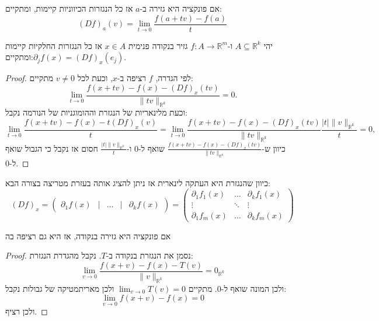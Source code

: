 \documentclass{tstextbook}
\begin{document}
\begin{proposition}
אם פונקציה היא גזירה ב-\(a\) אז כל הנגזרות הכיווניות קיימות, ומתקיים:
$$\left(D f\right)_{a}\left(v\right)=\operatorname*{lim}_{t\rightarrow0}{\frac{f\left(a+t v\right)-f\left(a\right)}{t}}$$

\end{proposition}
\begin{corollary}
יהי \(A\subseteq \mathbb{R}^k\) ו-\(f:A\to\mathbb{R}^m\) גזיר בנקודה פנימית \(x \in A\) אז כל הנגזרות החלקיות קיימות ומתקיים:\(\partial_{j}f(x)=(D f)_{x}(e_{j}).\)

\end{corollary}
\begin{proof}
לפי הגדרה, \(f\) רציפה ב-\(x\), וכעת לכל \(v\neq 0\) מתקיים:
$$\operatorname*{lim}_{t\to0}{\frac{f(x+t v )-f(x)-(D f)_{x}(t v )}{\|t v \|_{\mathbb{R}^{k}}}}=0.$$
וכעת מלינאריות של הנגזרת וההומוגניות של הנורמה נקבל:
$$\operatorname*{lim}_{t\to0}{\frac{f(x+t v)-f(x)-t\left(D f\right)_{x}(v)}{t}}=\operatorname*{lim}_{t\to0}{\frac{f(x+t v)-f(x)-\left(D f\right)_{x}(t v)}{\|t v\|_{\mathbb{R}^{k}}}}{\frac{|t|\|v\|_{\mathbb{R}^{k}}}{t}}=0,$$
כיוון ש-\(\frac{f(x+t v )\!-\!f(x)\!-\!(D f)_{x}(t v )}{\|t v \|_{\mathbb{R}^{k}}}\) שואף ל-0 ו-\(\frac{|t|\|v\|_{\mathbb{R}^{k}}}{t}\) חסום אז נקבל כי הגבול שואף ל-0.

\end{proof}
\begin{proposition}
כיוון שהנגזרת היא העתקה לינארית אז ניתן להציג אותה בעזרת מטריצה בצורה הבא:
$$(D f)_x=\left(\begin{array}{lllll}\partial_1 f(x) & \mid & \ldots & \mid & \partial_k f(x)\end{array}\right)=\left(\begin{array}{cccc}\partial_1 f_1(x) & \ldots & \partial_k f_1(x) \\\vdots & \ddots & \vdots \\\partial_1 f_m(x) & \ldots & \partial_k f_m(x)
\end{array}\right)$$

\end{proposition}
\begin{proposition}
אם פונקציה היא גזירה בנקודה, אז היא גם רציפה בה

\end{proposition}
\begin{proof}
נסמן את הנגזרת בנקודה ב-\(T\). נקבל מהגדרת הנגזרת:
$$\operatorname*{lim}_{ v \to0}{\frac{f\left( x+ v  \right)-f(x)-T\left(  v  \right)}{\| v \|_{\mathbb{R}^{k}}}}=0_{\mathbb{R}^k}$$
ולכן המונה שואף ל-0. מתקיים \(\lim_{ v \to 0 }T(v)=0\) ולכן מאריתמטיקה של גבולות נקבל:
$$\lim_{ v \to 0 } f(x+v)-f(x)=0$$
ולכן רציף.

\end{proof}
\end{document}
